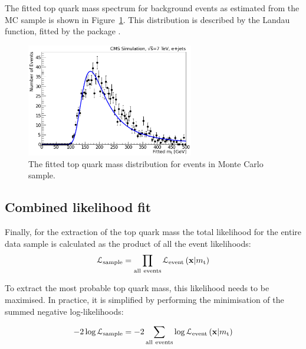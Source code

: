 The fitted top quark mass spectrum for background events as estimated from the \WpJets MC sample is shown in
Figure~\ref{fig:background_wjets_fitted_top_mass}. This distribution is described by the Landau function, fitted by the
\ROOT package \autocite{Landau}.

\begin{figure}[!htpb]
\begin{center}
	\includegraphics[width=0.65\textwidth]{background_wjets_fitted_top_mass}
	\caption{\label{fig:background_wjets_fitted_top_mass}
	The fitted top quark mass distribution for \ttbar events in \WpJets Monte Carlo sample.}
\end{center}
\end{figure}

\subsection{Combined likelihood fit}
\label{ss_top_mass:likelihood_fit}

Finally, for the extraction of the top quark mass the total likelihood for the entire data sample is calculated as the
product of all the event likelihoods:
\begin{equation}
\mathcal{L}_{\rm sample} = \prod_{\rm all~events}
\mathcal{L}_\textrm{event} \left(\mathbf{x}|m_\mathrm{t} \right)
\label{eq:CombinedLikelihood}
\end{equation}

To extract the most probable top quark mass, this likelihood needs to be maximised. In practice, it is simplified by
performing the minimisation of the summed negative log-likelihoods:

\begin{equation}
 -2\log{\mathcal{L}_{\rm sample}} = -2 \sum_{\rm all~events} \log{\mathcal{L}_\textrm{event} \left(\mathbf{x}|\mtop
 \right)}
\label{eq:CombinedLogLikelihood}
\end{equation}


